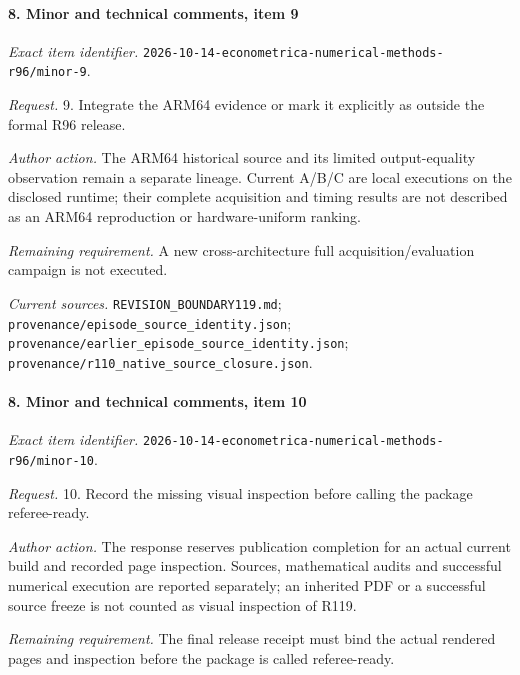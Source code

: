 \paragraph{8. Minor and technical comments, item 9}

\emph{Exact item identifier.} \nolinkurl{2026-10-14-econometrica-numerical-methods-r96/minor-9}.

\par\emph{Request.} 9. Integrate the ARM64 evidence or mark it explicitly as outside the formal R96 release.

\par\emph{Author action.} The ARM64 historical source and its limited output-equality observation remain a separate lineage. Current A/\allowbreak{}B/\allowbreak{}C are local executions on the disclosed runtime; their complete acquisition and timing results are not described as an ARM64 reproduction or hardware-uniform ranking.

\par\emph{Remaining requirement.} A new cross-architecture full acquisition/\allowbreak{}evaluation campaign is not executed.

\par\emph{Current sources.} \nolinkurl{REVISION_BOUNDARY119.md}; \nolinkurl{provenance/episode_source_identity.json}; \nolinkurl{provenance/earlier_episode_source_identity.json}; \nolinkurl{provenance/r110_native_source_closure.json}.

\paragraph{8. Minor and technical comments, item 10}

\emph{Exact item identifier.} \nolinkurl{2026-10-14-econometrica-numerical-methods-r96/minor-10}.

\par\emph{Request.} 10. Record the missing visual inspection before calling the package referee-ready.

\par\emph{Author action.} The response reserves publication completion for an actual current build and recorded page inspection. Sources, mathematical audits and successful numerical execution are reported separately; an inherited PDF or a successful source freeze is not counted as visual inspection of R119.

\par\emph{Remaining requirement.} The final release receipt must bind the actual rendered pages and inspection before the package is called referee-ready.


